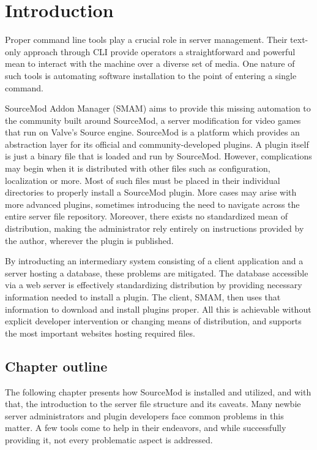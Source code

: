 \chapter{Introduction}

Proper command line tools play a crucial role in server management.
Their text-only approach through CLI provide operators a straightforward and powerful mean to interact with the machine over a diverse set of media.
One nature of such tools is automating software installation to the point of entering a single command.

SourceMod Addon Manager (SMAM) aims to provide this missing automation to the community built around SourceMod, a server modification for video games that run on Valve's Source engine.
SourceMod is a platform which provides an abstraction layer for its official and community-developed plugins.
A plugin itself is just a binary file that is loaded and run by SourceMod.
However, complications may begin when it is distributed with other files such as configuration, localization or more.
Most of such files must be placed in their individual directories to properly install a SourceMod plugin.
More cases may arise with more advanced plugins, sometimes introducing the need to navigate across the entire server file repository.
Moreover, there exists no standardized mean of distribution, making the administrator rely entirely on instructions provided by the author, wherever the plugin is published.

By introducting an intermediary system consisting of a client application and a server hosting a database, these problems are mitigated.
The database accessible via a web server is effectively standardizing distribution by providing necessary information needed to install a plugin.
The client, SMAM, then uses that information to download and install plugins proper.
All this is achievable without explicit developer intervention or changing means of distribution, and supports the most important websites hosting required files.

\section{Chapter outline}

The following chapter presents how SourceMod is installed and utilized, and with that, the introduction to the server file structure and its caveats.
Many newbie server administrators and plugin developers face common problems in this matter.
A few tools come to help in their endeavors, and while successfully providing it, not every problematic aspect is addressed.


